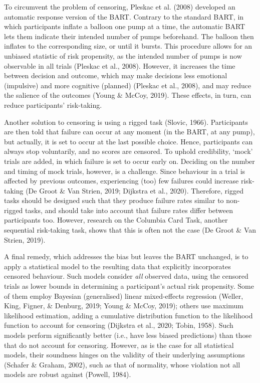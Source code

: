 \documentclass[serif, twocolumn, review]{jote-article}
\begin{document}
To circumvent the problem of censoring, Pleskac et al. (2008) developed an automatic response version of the BART. Contrary to the standard BART, in which participants inflate a balloon one pump at a time, the automatic BART lets them indicate their intended number of pumps beforehand. The balloon then inflates to the corresponding size, or until it bursts. This procedure allows for an unbiased statistic of risk propensity, as the intended number of pumps is now observable in all trials (Pleskac et al., 2008). However, it increases the time between decision and outcome, which may make decisions less emotional (impulsive) and more cognitive (planned) (Pleskac et al., 2008), and may reduce the salience of the outcomes (Young \& McCoy, 2019). These effects, in turn, can reduce participants' risk-taking.

Another solution to censoring is using a rigged task (Slovic, 1966). Participants are then told that failure can occur at any moment (in the BART, at any pump), but actually, it is set to occur at the last possible choice. Hence, participants can always stop voluntarily, and no scores are censored. To uphold credibility, `mock' trials are added, in which failure is set to occur early on. Deciding on the number and timing of mock trials, however, is a challenge. Since behaviour in a trial is affected by previous outcomes, experiencing (too) few failures could increase risk-taking (De Groot \& Van Strien, 2019; Dijkstra et al., 2020). Therefore, rigged tasks should be designed such that they produce failure rates similar to non-rigged tasks, and should take into account that failure rates differ between participants too. However, research on the Columbia Card Task, another sequential risk-taking task, shows that this is often not the case (De Groot \& Van Strien, 2019).

A final remedy, which addresses the bias but leaves the BART unchanged, is to apply a statistical model to the resulting data that explicitly incorporates censored behaviour. Such models consider \textit{all} observed data, using the censored trials as lower bounds in determining a participant's actual risk propensity. Some of them employ Bayesian (generalised) linear mixed-effects regression (Weller, King, Figner, \& Denburg, 2019; Young \& McCoy, 2019); others use maximum likelihood estimation, adding a cumulative distribution function to the likelihood function to account for censoring (Dijkstra et al., 2020; Tobin, 1958). Such models perform significantly better (i.e., have less biased predictions) than those that do not account for censoring. However, as is the case for all statistical models, their soundness hinges on the validity of their underlying assumptions (Schafer \& Graham, 2002), such as that of normality, whose violation not all models are robust against (Powell, 1984).
\end{document}
